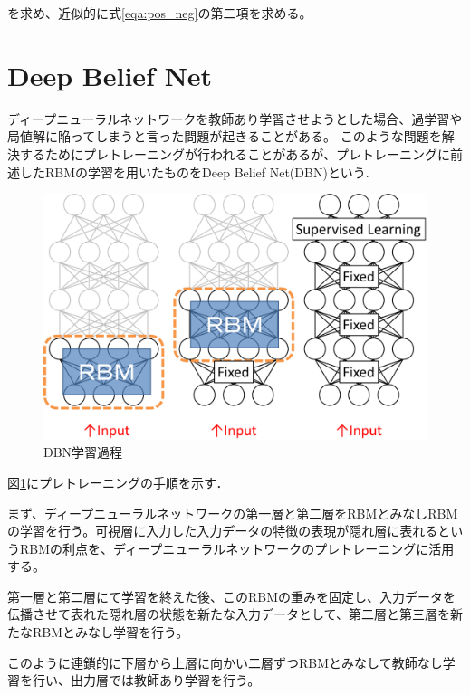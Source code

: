 を求め、近似的に式\ref{eqa:pos_neg}の第二項を求める。

\section{Deep Belief Net}

ディープニューラルネットワークを教師あり学習させようとした場合、過学習や局値解に陥ってしまうと言った問題が起きることがある。
このような問題を解決するためにプレトレーニングが行われることがあるが、プレトレーニングに前述したRBMの学習を用いたものをDeep Belief Net(DBN)\cite{DBN}という.

\begin{figure}[tb]
 \begin{center}
  \includegraphics[scale=0.2]{./img_dl/dbn.eps}
  \hspace*{0cm}
  \vspace*{0cm} 
  \caption{DBN学習過程}
  \label{fig:dbn}
 \end{center}
\end{figure}

図\ref{fig:dbn}にプレトレーニング\cite{glw-training}の手順を示す．

まず、ディープニューラルネットワークの第一層と第二層をRBMとみなしRBMの学習を行う。可視層に入力した入力データの特徴の表現が隠れ層に表れるというRBMの利点を、ディープニューラルネットワークのプレトレーニングに活用する。

第一層と第二層にて学習を終えた後、このRBMの重みを固定し、入力データを伝播させて表れた隠れ層の状態を新たな入力データとして、第二層と第三層を新たなRBMとみなし学習を行う。

このように連鎖的に下層から上層に向かい二層ずつRBMとみなして教師なし学習を行い、出力層では教師あり学習を行う。

